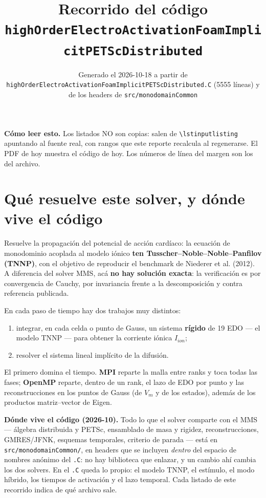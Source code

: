 \documentclass[11pt,a4paper]{article}
\title{\textbf{Recorrido del código}\\[4pt]\large\texttt{highOrderElectroActivationFoamImplicitPETScDistributed}}
\author{}
\date{Generado el 2026-10-18 a partir de \texttt{highOrderElectroActivationFoamImplicitPETScDistributed.C} (5555 líneas) y de los headers de \texttt{src/monodomainCommon}}
\begin{document}
\maketitle

\noindent\textbf{Cómo leer esto.} Los listados NO son copias: salen de \texttt{\textbackslash lstinputlisting} apuntando al fuente real, con rangos que este reporte recalcula al regenerarse. El PDF de hoy muestra el código de hoy. Los números de línea del margen son los del archivo.

\tableofcontents

\newpage

\section{Qué resuelve este solver, y dónde vive el código}

Resuelve la propagación del potencial de acción cardíaco: la ecuación de
monodominio acoplada al modelo iónico \textbf{ten Tusscher--Noble--Noble--Panfilov
(TNNP)}, con el objetivo de reproducir el benchmark de Niederer et al. (2012).
A diferencia del solver MMS, acá \textbf{no hay solución exacta}: la verificación
es por convergencia de Cauchy, por invariancia frente a la descomposición y
contra referencia publicada.

En cada paso de tiempo hay dos trabajos muy distintos:
%
\begin{enumerate}
  \item integrar, en cada celda o punto de Gauss, un sistema \textbf{rígido} de
        19 EDO --- el modelo TNNP --- para obtener la corriente iónica $I_{ion}$;
  \item resolver el sistema lineal implícito de la difusión.
\end{enumerate}
%
El primero domina el tiempo. \textbf{MPI} reparte la malla entre ranks y toca
todas las fases; \textbf{OpenMP} reparte, dentro de un rank, el lazo de EDO por
punto y las reconstrucciones en los puntos de Gauss (de $V_m$ y de los
estados), además de los productos matriz--vector de Eigen.

\textbf{Dónde vive el código (2026-10).} Todo lo que el solver comparte con el MMS
--- álgebra distribuida y PETSc, ensamblado de masa y rigidez, reconstrucciones,
GMRES/JFNK, esquemas temporales, criterio de parada --- está en
\texttt{src/monodomainCommon/}, en headers que se incluyen \emph{dentro} del
espacio de nombres anónimo del \texttt{.C}: no hay biblioteca que enlazar, y un
cambio ahí cambia los dos solvers. En el \texttt{.C} queda lo propio: el modelo
TNNP, el estímulo, el modo híbrido, los tiempos de activación y el lazo temporal.
Cada listado de este recorrido indica de qué archivo sale.
\end{document}
